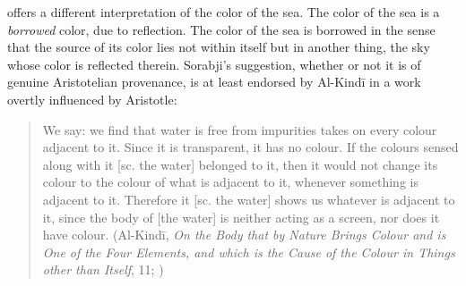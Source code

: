 \citet[130--131]{Sorabji:2004fk} offers a different interpretation of the color of the sea. The color of the sea is a \emph{borrowed} color, due to reflection. The color of the sea is borrowed in the sense that the source of its color lies not within itself but in another thing, the sky whose color is reflected therein. Sorabji's suggestion, whether or not it is of genuine Aristotelian provenance, is at least endorsed by Al-Kind\={i} in a work overtly influenced by Aristotle: 
\begin{quote}
	We say: we find that water is free from impurities takes on every colour adjacent to it. Since it is transparent, it has no colour. If the colours sensed along with it [sc. the water] belonged to it, then it would not change its colour to the colour of what is adjacent to it, whenever something is adjacent to it. Therefore it [sc. the water] shows us whatever is adjacent to it, since the body of [the water] is neither acting as a screen, nor does it have colour. (Al-Kind\={i}, \emph{On the Body that by Nature Brings Colour and is One of the Four Elements, and which is the Cause of the Colour in Things other than Itself}, 11; \citealt[138]{Adamson:2012fk})
\end{quote}

